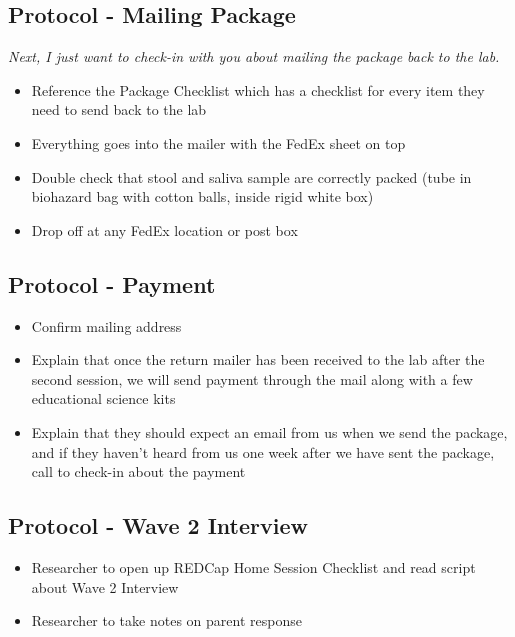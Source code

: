 \documentclass[]{book}
\providecommand{\tightlist}{%
  \setlength{\itemsep}{0pt}\setlength{\parskip}{0pt}}
\begin{document}
\hypertarget{protocol---mailing-package}{%
\subsection{Protocol - Mailing Package}\label{protocol---mailing-package}}

\emph{Next, I just want to check-in with you about mailing the package back to the lab.}

\begin{itemize}
\tightlist
\item
  Reference the Package Checklist which has a checklist for every item they need to send back to the lab
\item
  Everything goes into the mailer with the FedEx sheet on top
\item
  Double check that stool and saliva sample are correctly packed (tube in biohazard bag with cotton balls, inside rigid white box)
\item
  Drop off at any FedEx location or post box
\end{itemize}

\hypertarget{protocol---payment}{%
\subsection{Protocol - Payment}\label{protocol---payment}}

\begin{itemize}
\tightlist
\item
  Confirm mailing address
\item
  Explain that once the return mailer has been received to the lab after the second session, we will send payment through the mail along with a few educational science kits
\item
  Explain that they should expect an email from us when we send the package, and if they haven't heard from us one week after we have sent the package, call to check-in about the payment
\end{itemize}

\hypertarget{protocol---wave-2-interview}{%
\subsection{Protocol - Wave 2 Interview}\label{protocol---wave-2-interview}}

\begin{itemize}
\tightlist
\item
  Researcher to open up REDCap Home Session Checklist and read script about Wave 2 Interview
\item
  Researcher to take notes on parent response
\end{itemize}
\end{document}
